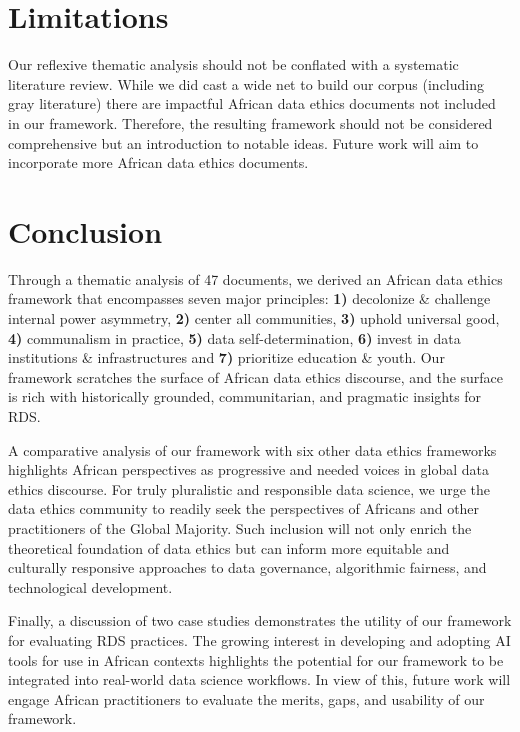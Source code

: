 \section{Limitations}
Our reflexive thematic analysis should not be conflated with a systematic literature review. While we did cast a wide net to build our corpus (including gray literature) there are impactful African data ethics documents not included in our framework. Therefore, the resulting framework should not be considered comprehensive but an introduction to notable ideas. Future work will aim to incorporate more African data ethics documents.

\section{Conclusion}
Through a thematic analysis of 47 documents, we derived an African data ethics framework that encompasses seven major principles: \textbf{1)} decolonize \& challenge internal power asymmetry, \textbf{2)} center all communities, \textbf{3)} uphold universal good, \textbf{4)} communalism in practice, \textbf{5)} data self-determination, \textbf{6)} invest in data institutions \& infrastructures and \textbf{7)} prioritize education \& youth. Our framework scratches the surface of African data ethics discourse, and the surface is rich with historically grounded, communitarian, and pragmatic insights for RDS.

A comparative analysis of our framework with six other data ethics frameworks highlights African perspectives as progressive and needed voices in global data ethics discourse. For truly pluralistic and responsible data science, we urge the data ethics community to readily seek the perspectives of Africans and other practitioners of the Global Majority. Such inclusion will not only enrich the theoretical foundation of data ethics but can inform more equitable and culturally responsive approaches to data governance, algorithmic fairness, and technological development. 

Finally, a discussion of two case studies demonstrates the utility of our framework for evaluating RDS practices. The growing interest in developing and adopting AI tools for use in African contexts highlights the potential for our framework to be integrated into real-world data science workflows. In view of this, future work will engage African practitioners to evaluate the merits, gaps, and usability of our framework. 

